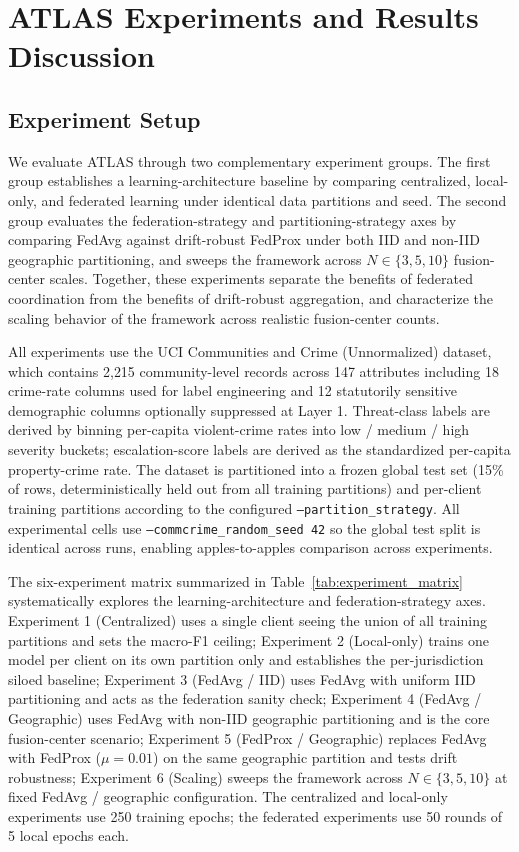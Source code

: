 \documentclass[conference]{IEEEtran}
\begin{document}
\section{ATLAS Experiments and Results Discussion}
\label{sec:experiments}

\subsection{Experiment Setup}

We evaluate ATLAS through two complementary experiment groups. The first group establishes a learning-architecture baseline by comparing centralized, local-only, and federated learning under identical data partitions and seed. The second group evaluates the federation-strategy and partitioning-strategy axes by comparing FedAvg against drift-robust FedProx under both IID and non-IID geographic partitioning, and sweeps the framework across $N \in \{3, 5, 10\}$ fusion-center scales. Together, these experiments separate the benefits of federated coordination from the benefits of drift-robust aggregation, and characterize the scaling behavior of the framework across realistic fusion-center counts.

All experiments use the UCI Communities and Crime (Unnormalized) dataset, which contains 2{,}215 community-level records across 147 attributes including 18 crime-rate columns used for label engineering and 12 statutorily sensitive demographic columns optionally suppressed at Layer 1. Threat-class labels are derived by binning per-capita violent-crime rates into low / medium / high severity buckets; escalation-score labels are derived as the standardized per-capita property-crime rate. The dataset is partitioned into a frozen global test set (15\% of rows, deterministically held out from all training partitions) and per-client training partitions according to the configured \texttt{--partition\_strategy}. All experimental cells use \texttt{--commcrime\_random\_seed 42} so the global test split is identical across runs, enabling apples-to-apples comparison across experiments.

The six-experiment matrix summarized in Table~\ref{tab:experiment_matrix} systematically explores the learning-architecture and federation-strategy axes. Experiment 1 (Centralized) uses a single client seeing the union of all training partitions and sets the macro-F1 ceiling; Experiment 2 (Local-only) trains one model per client on its own partition only and establishes the per-jurisdiction siloed baseline; Experiment 3 (FedAvg / IID) uses FedAvg with uniform IID partitioning and acts as the federation sanity check; Experiment 4 (FedAvg / Geographic) uses FedAvg with non-IID geographic partitioning and is the core fusion-center scenario; Experiment 5 (FedProx / Geographic) replaces FedAvg with FedProx ($\mu = 0.01$) on the same geographic partition and tests drift robustness; Experiment 6 (Scaling) sweeps the framework across $N \in \{3, 5, 10\}$ at fixed FedAvg / geographic configuration. The centralized and local-only experiments use 250 training epochs; the federated experiments use 50 rounds of 5 local epochs each.
\end{document}
